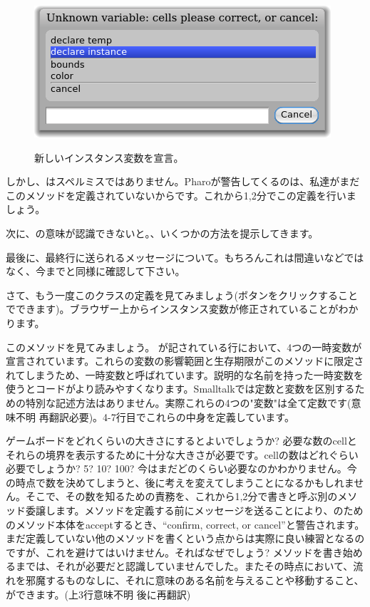 \documentclass[a4paper,10pt,twoside]{book}
\begin{document}
\begin{figure}[htb]
\begin{minipage}{0.48\textwidth}
		{\includegraphics[scale=0.7]{DeclareInstanceVar}}
	\caption{新しいインスタンス変数を宣言。}
\end{minipage}
\end{figure}

しかし、はスペルミスではありません。Pharoが警告してくるのは、私達がまだこのメソッドを定義されていないからです。これから1,2分でこの定義を行いましょう。


次に、の意味が認識できないと。、いくつかの方法を提示してきます。

最後に、最終行に送られるメッセージについて。もちろんこれは間違いなどではなく、今までと同様に確認して下さい。

さて、もう一度このクラスの定義を見てみましょう(ボタンをクリックすることでできます)。ブラウザー上からインスタンス変数が修正されていることがわかります。

このメソッドを見てみましょう。
が記されている行において、4つの一時変数が宣言されています。これらの変数の影響範囲と生存期限がこのメソッドに限定されてしまうため、一時変数と呼ばれています。説明的な名前を持った一時変数を使うとコードがより読みやすくなります。Smalltalkでは定数と変数を区別するための特別な記述方法はありません。実際これらの4つの"変数"は全て定数です(意味不明 再翻訳必要)。4-7行目でこれらの中身を定義しています。

ゲームボードをどれくらいの大きさにするとよいでしょうか? 必要な数のcellとそれらの境界を表示するために十分な大きさが必要です。cellの数はどれぐらい必要でしょうか? 5? 10? 100? 今はまだどのくらい必要なのかわかりません。今の時点で数を決めてしまうと、後に考えを変えてしまうことになるかもしれません。そこで、その数を知るための責務を、これから1,2分で書きと呼ぶ別のメソッド委譲します。メソッドを定義する前にメッセージを送ることにより、のためのメソッド本体をacceptするとき、``confirm, correct, or cancel''と警告されます。まだ定義していない他のメソッドを書くという点からは実際に良い練習となるのですが、これを避けてはいけません。そればなぜでしょう? 
メソッドを書き始めるまでは、それが必要だと認識していませんでした。またその時点において、流れを邪魔するものなしに、それに意味のある名前を与えることや移動すること、ができます。(上3行意味不明 後に再翻訳)
\end{document}

